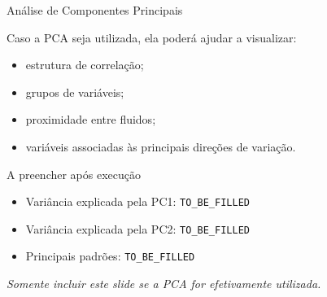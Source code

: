 \begin{frame}{Análise de Componentes Principais}

    Caso a PCA seja utilizada, ela poderá ajudar a visualizar:

    \begin{itemize}
        \item estrutura de correlação;
        \item grupos de variáveis;
        \item proximidade entre fluidos;
        \item variáveis associadas às principais direções de variação.
    \end{itemize}

    \vspace{0.3cm}

    \begin{block}{A preencher após execução}
        \begin{itemize}
            \item Variância explicada pela PC1:
                  \texttt{TO\_BE\_FILLED}
            \item Variância explicada pela PC2:
                  \texttt{TO\_BE\_FILLED}
            \item Principais padrões:
                  \texttt{TO\_BE\_FILLED}
        \end{itemize}
    \end{block}

    \vspace{0.2cm}

    \centering
    \textit{Somente incluir este slide se a PCA for efetivamente utilizada.}

\end{frame}




